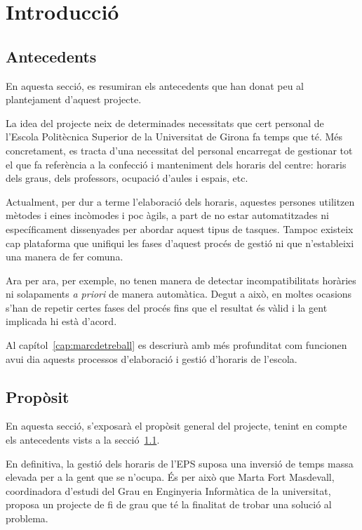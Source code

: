 \documentclass[a4paper,12pt]{ThesisStyle}
\begin{document}
\chapter{Introducció}
\label{cap:intro}

\section{Antecedents}
\label{sec:antecedents}

En aquesta secció, es resumiran els antecedents que han donat peu al plantejament d'aquest projecte.

La idea del projecte neix de determinades necessitats que cert personal de l'Escola Politècnica Superior de la Universitat de Girona fa temps que té. Més concretament, es tracta d'una necessitat del personal encarregat de gestionar tot el que fa referència a la confecció i manteniment dels horaris del centre: horaris dels graus, dels professors, ocupació d'aules i espais, etc.

Actualment, per dur a terme l'elaboració dels horaris, aquestes persones utilitzen mètodes i eines incòmodes i poc àgils, a part de no estar automatitzades ni específicament dissenyades per abordar aquest tipus de tasques. Tampoc existeix cap plataforma que unifiqui les fases d'aquest procés de gestió ni que n'estableixi una manera de fer comuna.

Ara per ara, per exemple, no tenen manera de detectar incompatibilitats horàries ni solapaments \textit{a priori} de manera automàtica. Degut a això, en moltes ocasions s'han de repetir certes fases del procés fins que el resultat és vàlid i la gent implicada hi està d'acord.

Al capítol~\ref{cap:marcdetreball} es descriurà amb més profunditat com funcionen avui dia aquests processos d'elaboració i gestió d'horaris de l'escola.

\section{Propòsit}
\label{sec:proposit}

En aquesta secció, s'exposarà el propòsit general del projecte, tenint en compte els antecedents vists a la secció~\ref{sec:antecedents}.

En definitiva, la gestió dels horaris de l'EPS suposa una inversió de temps massa elevada per a la gent que se n'ocupa. És per això que Marta Fort Masdevall, coordinadora d'estudi del Grau en Enginyeria Informàtica de la universitat, proposa un projecte de fi de grau que té la finalitat de trobar una solució al problema.
\end{document}

